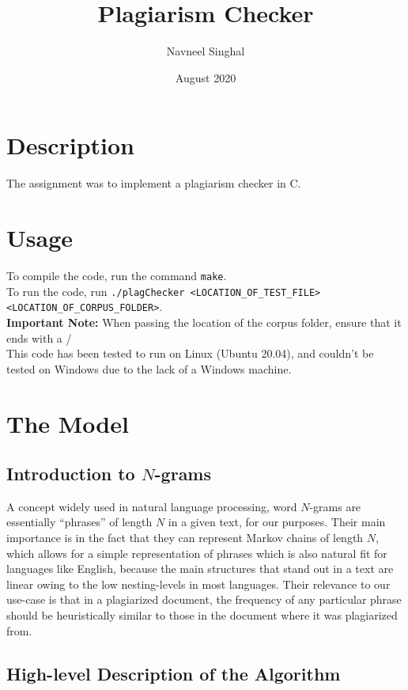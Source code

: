 \documentclass{article}
\title{\fontfamily{cmss}\selectfont Plagiarism Checker}
\author{Navneel Singhal}
\date{August 2020}
\begin{document}
\maketitle

\section*{Description}

The assignment was to implement a plagiarism checker in C.

\section*{Usage}

To compile the code, run the command \texttt{make}. \\
To run the code, run \texttt{./plagChecker <LOCATION\_OF\_TEST\_FILE> <LOCATION\_OF\_CORPUS\_FOLDER>}.
\\
\textbf{Important Note:} When passing the location of the corpus folder, ensure that it ends with a /
\\
This code has been tested to run on Linux (Ubuntu 20.04), and couldn't be tested on Windows due to the lack of a Windows machine.

\section*{The Model}

\subsection*{Introduction to $N$-grams}
A concept widely used in natural language processing, word $N$-grams are essentially ``phrases'' of length $N$ in a given text, for our purposes. 
Their main importance is in the fact that they can represent Markov chains of length $N$, which allows for a simple representation of phrases which is also natural fit for languages like English, because the main structures that stand out in a text are linear owing to the low nesting-levels in most languages.
Their relevance to our use-case is that in a plagiarized document, the frequency of any particular phrase should be heuristically similar to those in the document where it was plagiarized from.

\subsection*{High-level Description of the Algorithm}
\end{document}
